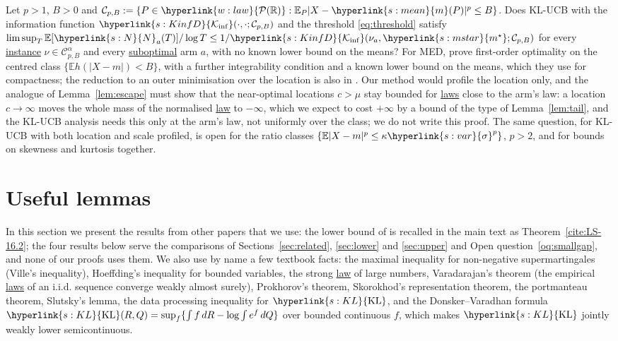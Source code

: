 \documentclass[11pt]{article}
\newcommand{\E}{\mathbb{E}}
\newcommand{\Pspace}{\term{w:law}{\mathcal{P}(\mathbb{R})}}
\newcommand{\sy}[2]{{\hyperlink{#1}{#2}}}
\newcommand{\term}[2]{\hyperlink{#1}{#2}}
\newcommand{\mean}{\sy{s:mean}{m}}
\newcommand{\sd}{\sy{s:var}{\sigma}}
\newcommand{\KL}{\sy{s:KL}{\mathrm{KL}}}
\newcommand{\mstar}{\sy{s:mstar}{m^{\star}}}
\newcommand{\Kinf}{\sy{s:KinfD}{\mathcal{K}_{\inf}}}
\newcommand{\Np}{\sy{s:N}{N}}
\begin{document}
\begin{openquestion}\label{oq:profiled}
Let $p>1$, $B>0$ and $\mathcal C_{p,B}:=\{P\in\Pspace:\E_P|X-\mean(P)|^p\le B\}$. Does KL-UCB with the information function
$\Kinf(\cdot,\cdot;\mathcal C_{p,B})$ and the threshold \eqref{eq:threshold} satisfy
$\limsup_T\E[\Np_a(T)]/\log T\le1/\Kinf(\nu_a,\mstar;\mathcal C_{p,B})$ for every \term{w:instance}{instance} $\nu\in\mathcal C_{p,B}^\alpha$ and every
\term{w:subopt}{suboptimal} arm $a$, with no known lower bound on the means? For MED, \citet[Corollary~6]{BSH23} prove first-order
optimality on the centred class $\{\E h(|X-m|)<B\}$, with a further integrability condition and a known lower bound on
the means, which they use for compactness; the reduction to an outer minimisation over the location is also in
\citet[Section~6.10]{A22}. Our method would profile the location only, and the analogue of Lemma~\ref{lem:escape} must
show that the near-optimal locations $c>\mu$ stay bounded for \term{w:law}{laws} close to the arm's law: a location $c\to\infty$
moves the whole mass of the normalised \term{w:law}{law} to $-\infty$, which we expect to cost $+\infty$ by a bound of the type
of Lemma~\ref{lem:tail}, and the KL-UCB analysis needs this only at the arm's law, not uniformly over the class; we
do not write this proof. The same question, for KL-UCB with both location and scale
profiled, is open for the ratio classes $\{\E|X-m|^p\le\kappa\sd^p\}$, $p>2$, and for bounds on skewness and kurtosis
together.
\end{openquestion}


\appendix

\section{Useful lemmas}\label{sec:cited}

In this section we present the results from other papers that we use: the lower bound of
\citet{LS} is recalled in the main text as Theorem~\ref{cite:LS-16.2}; the four results below serve the
comparisons of Sections~\ref{sec:related}, \ref{sec:lower} and \ref{sec:upper} and Open question~\ref{oq:smallgap}, and
none of our proofs uses them. We also use by name a few textbook facts: the maximal inequality for non-negative
supermartingales \citep[Theorem~3.9]{LS} (Ville's inequality), Hoeffding's inequality for bounded
variables, the strong \term{w:law}{law} of large numbers, Varadarajan's theorem (the empirical \term{w:law}{laws} of an i.i.d.
sequence converge weakly almost surely), Prokhorov's theorem, Skorokhod's representation theorem, the
portmanteau theorem, Slutsky's lemma, the data processing inequality for $\KL$, and the
Donsker--Varadhan formula $\KL(R,Q)=\sup_f\{\int f\,dR-\log\int e^f\,dQ\}$ over bounded continuous $f$, which
makes $\KL$ jointly weakly lower semicontinuous.
\end{document}

